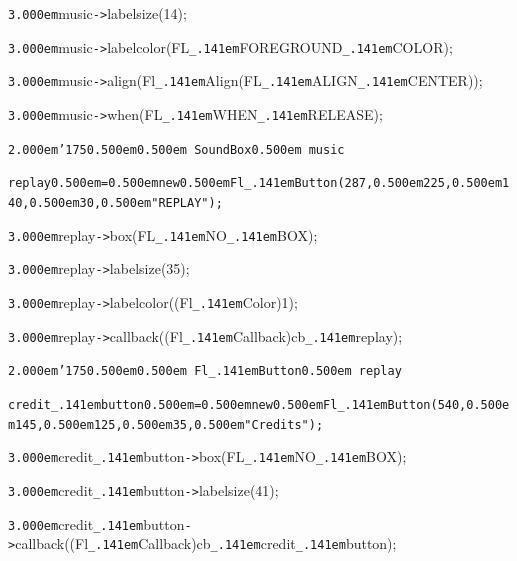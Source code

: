 \documentclass[12pt]{article}
\begin{document}
\noindent
{}{\tt\mc \kern3.000em}music{\tt -}{\tt >}labelsize(14);

\noindent
{}{\tt\mc \kern3.000em}music{\tt -}{\tt >}labelcolor(FL{\tt\_\kern.141em}FOREGROUND{\tt\_\kern.141em}COLOR);

\noindent
{}{\tt\mc \kern3.000em}music{\tt -}{\tt >}align(Fl{\tt\_\kern.141em}Align(FL{\tt\_\kern.141em}ALIGN{\tt\_\kern.141em}CENTER));

\noindent
{}{\tt\mc \kern3.000em}music{\tt -}{\tt >}when(FL{\tt\_\kern.141em}WHEN{\tt\_\kern.141em}RELEASE);

\noindent
{}{\tt\mc \kern2.000em}{\tt\char'175}{\tt\mc \kern0.500em}\tt\mc {\tt /}{\tt /}\kern0.500em SoundBox{\tt *}\kern0.500em music

\noindent
\tt{}replay{\tt\mc \kern0.500em}={\tt\mc \kern0.500em}new{\tt\mc \kern0.500em}Fl{\tt\_\kern.141em}Button(287,{\tt\mc \kern0.500em}225,{\tt\mc \kern0.500em}140,{\tt\mc \kern0.500em}30,{\tt\mc \kern0.500em}{\tt "}REPLAY{\tt "});

\noindent
{}{\tt\mc \kern3.000em}replay{\tt -}{\tt >}box(FL{\tt\_\kern.141em}NO{\tt\_\kern.141em}BOX);

\noindent
{}{\tt\mc \kern3.000em}replay{\tt -}{\tt >}labelsize(35);

\noindent
{}{\tt\mc \kern3.000em}replay{\tt -}{\tt >}labelcolor((Fl{\tt\_\kern.141em}Color)1);

\noindent
{}{\tt\mc \kern3.000em}replay{\tt -}{\tt >}callback((Fl{\tt\_\kern.141em}Callback{\tt *})cb{\tt\_\kern.141em}replay);

\noindent
{}{\tt\mc \kern2.000em}{\tt\char'175}{\tt\mc \kern0.500em}\tt\mc {\tt /}{\tt /}\kern0.500em Fl{\tt\_\kern.141em}Button{\tt *}\kern0.500em replay

\noindent
\tt{}credit{\tt\_\kern.141em}button{\tt\mc \kern0.500em}={\tt\mc \kern0.500em}new{\tt\mc \kern0.500em}Fl{\tt\_\kern.141em}Button(540,{\tt\mc \kern0.500em}145,{\tt\mc \kern0.500em}125,{\tt\mc \kern0.500em}35,{\tt\mc \kern0.500em}{\tt "}Credits{\tt "});

\noindent
{}{\tt\mc \kern3.000em}credit{\tt\_\kern.141em}button{\tt -}{\tt >}box(FL{\tt\_\kern.141em}NO{\tt\_\kern.141em}BOX);

\noindent
{}{\tt\mc \kern3.000em}credit{\tt\_\kern.141em}button{\tt -}{\tt >}labelsize(41);

\noindent
{}{\tt\mc \kern3.000em}credit{\tt\_\kern.141em}button{\tt -}{\tt >}callback((Fl{\tt\_\kern.141em}Callback{\tt *})cb{\tt\_\kern.141em}credit{\tt\_\kern.141em}button);
\end{document}
